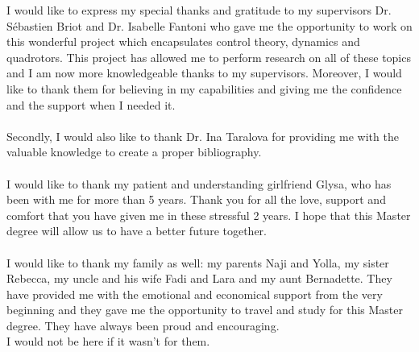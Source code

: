 \documentclass{thesisreport}
\begin{document}
I would like to express my special thanks and gratitude to my supervisors Dr. Sébastien Briot and Dr. Isabelle Fantoni who gave me the  opportunity to work on this wonderful project which encapsulates control theory, dynamics and quadrotors. This project has allowed me to perform research on all of these topics and I am now more knowledgeable thanks to my supervisors. Moreover, I would like to thank them for believing in my capabilities and giving me the confidence and the support when I needed it. \\\\
Secondly, I would also like to thank Dr. Ina Taralova for providing me with the valuable knowledge to create a proper bibliography. \\\\
I would like to thank my patient and understanding girlfriend Glysa, who has been with me for more than 5 years. Thank you for all the love, support and comfort that you have given me in these stressful 2 years. I hope that this Master degree will allow us to have a better future together. \\\\
I would like to thank my family as well: my parents Naji and Yolla, my sister Rebecca, my uncle and his wife Fadi and Lara and my aunt Bernadette. They have provided me with the emotional and economical support from the very beginning and they gave me the opportunity to travel and study for this Master degree. They have always been proud and encouraging. \\I would not be here if it wasn't for them.

 
 \newpage
 
 
\end{document}
